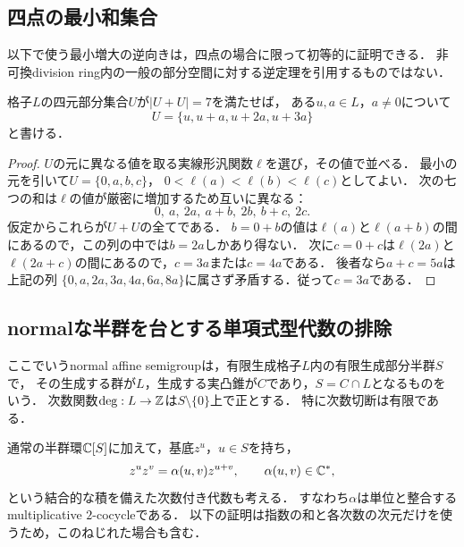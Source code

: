 \documentclass[11pt,a4paper]{ltjsarticle}
\begin{document}
\subsection{四点の最小和集合}
以下で使う最小増大の逆向きは，四点の場合に限って初等的に証明できる．
非可換division ring内の一般の部分空間に対する逆定理を引用するものではない．

\begin{lemma}\label{lem:fourpoints}
格子$L$の四元部分集合$U$が$|U+U|=7$を満たせば，
ある$u,a\in L$，$a\ne0$について
\[
 U=\{u,u+a,u+2a,u+3a\}
\]
と書ける．
\end{lemma}
\begin{proof}
$U$の元に異なる値を取る実線形汎関数$\ell$を選び，その値で並べる．
最小の元を引いて$U=\{0,a,b,c\}$，
$0<\ell(a)<\ell(b)<\ell(c)$としてよい．
次の七つの和は$\ell$の値が厳密に増加するため互いに異なる：
\[
 0,\ a,\ 2a,\ a+b,\ 2b,\ b+c,\ 2c.
\]
仮定からこれらが$U+U$の全てである．
$b=0+b$の値は$\ell(a)$と$\ell(a+b)$の間にあるので，この列の中では$b=2a$しかあり得ない．
次に$c=0+c$は$\ell(2a)$と$\ell(2a+c)$の間にあるので，$c=3a$または$c=4a$である．
後者なら$a+c=5a$は上記の列
$\{0,a,2a,3a,4a,6a,8a\}$に属さず矛盾する．従って$c=3a$である．
\end{proof}

\subsection{normalな半群を台とする単項式型代数の排除}
ここでいうnormal affine semigroupは，有限生成格子$L$内の有限生成部分半群$S$で，
その生成する群が$L$，生成する実凸錐が$C$であり，$S=C\cap L$となるものをいう．
次数関数$\deg:L\to\mathbb Z$は$S\setminus\{0\}$上で正とする．
特に次数切断は有限である．

通常の半群環$\mathbb C[S]$に加えて，基底$z^u$，$u\in S$を持ち，
\[
 z^u z^v=\alpha(u,v)z^{u+v},\qquad\alpha(u,v)\in\mathbb C^*,
\]
という結合的な積を備えた次数付き代数も考える．
すなわち$\alpha$は単位と整合するmultiplicative $2$-cocycleである．
以下の証明は指数の和と各次数の次元だけを使うため，このねじれた場合も含む．
\end{document}
